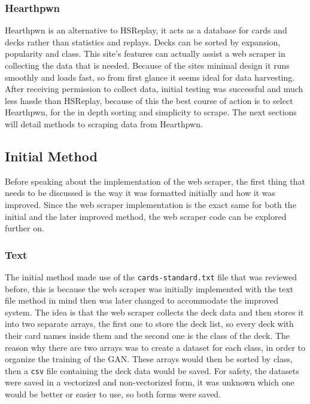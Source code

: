 \documentclass{report} %
\begin{document}
\subsubsection{Hearthpwn}
Hearthpwn is an alternative to HSReplay, it acts as a database for cards and decks rather than statistics and replays. Decks can be sorted by expansion, popularity and class. This site's features can actually assist a web scraper in collecting the data that is needed. Because of the sites minimal design it runs smoothly and loads fast, so from first glance it seems ideal for data harvesting. After receiving permission to collect data, initial testing was successful and much less hassle than HSReplay, because of this the best course of action is to select Hearthpwn, for the in depth sorting and simplicity to scrape. The next sections will detail methods to scraping data from Hearthpwn.
\subsection{Initial Method}
Before speaking about the implementation of the web scraper, the first thing that needs to be discussed is the way it was formatted initially and how it was improved. Since the web scraper implementation is the exact same for both the initial and the later improved method, the web scraper code can be explored further on.
\subsubsection{Text}
The initial method made use of the \nolinkurl{cards-standard.txt} file that was reviewed before, this is because the web scraper was initially implemented with the text file method in mind then was later changed to accommodate the improved system. The idea is that the web scraper collects the deck data and then stores it into two separate arrays, the first one to store the deck list, so every deck with their card names inside them and the second one is the class of the deck. The reason why there are two arrays was to create a dataset for each class, in order to organize the training of the GAN. These arrays would then be sorted by class, then a \nolinkurl{csv} file containing the deck data would be saved. For safety, the datasets were saved in a vectorized and non-vectorized form, it was unknown which one would be better or easier to use, so both forms were saved.
\end{document}
